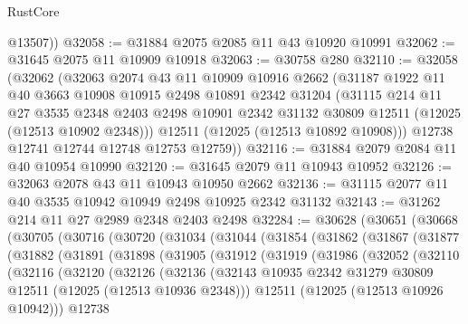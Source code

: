 \begin{lexlean}{RustCore}
\begin{coremodule}
        @13507))
@32058 := @31884 @2075 @2085 @11 @43 @10920 @10991
@32062 := @31645 @2075 @11 @10909 @10918
@32063 := @30758 @280
@32110 := @32058
    (@32062
      (@32063
        @2074
        @43
        @11
        @10909
        @10916
        @2662
        (@31187
          @1922
          @11
          @40
          @3663
          @10908
          @10915
          @2498
          @10891
          @2342
          @31204
          (@31115
            @214
            @11
            @27
            @3535
            @2348
            @2403
            @2498
            @10901
            @2342
            @31132
            @30809
            @12511
            (@12025 (@12513 @10902 @2348)))
          @12511
          (@12025 (@12513 @10892 @10908)))
        @12738
        @12741
        @12744
        @12748
        @12753
        @12759))
@32116 := @31884 @2079 @2084 @11 @40 @10954 @10990
@32120 := @31645 @2079 @11 @10943 @10952
@32126 := @32063 @2078 @43 @11 @10943 @10950 @2662
@32136 := @31115 @2077 @11 @40 @3535 @10942 @10949 @2498 @10925 @2342 @31132
@32143 := @31262 @214 @11 @27 @2989 @2348 @2403 @2498
@32284 := @30628
    (@30651
      (@30668
        (@30705
          (@30716
            (@30720
              (@31034
                (@31044
                  (@31854
                    (@31862
                      (@31867
                        (@31877
                          (@31882
                            (@31891
                              (@31898
                                (@31905
                                  (@31912
                                    (@31919
                                      (@31986
                                        (@32052
                                          (@32110
                                            (@32116
                                              (@32120
                                                (@32126
                                                  (@32136
                                                    (@32143
                                                      @10935
                                                      @2342
                                                      @31279
                                                      @30809
                                                      @12511
                                                      (@12025 (@12513 @10936 @2348)))
                                                    @12511
                                                    (@12025 (@12513 @10926 @10942)))
                                                  @12738

\end{coremodule}
\end{lexlean}
